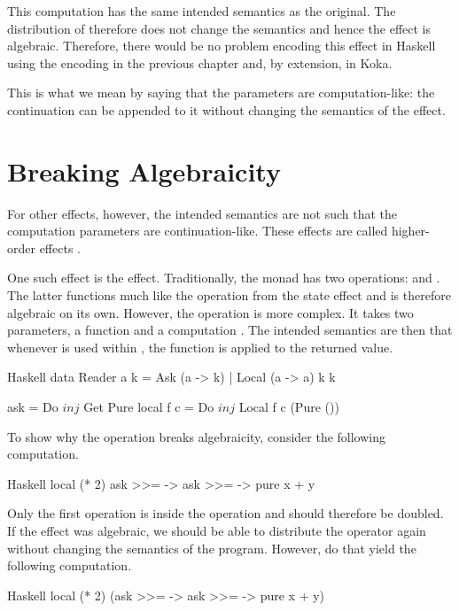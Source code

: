 This computation has the same intended semantics as the original. The distribution of \hs{>>=} therefore does not change the semantics and hence the effect is algebraic. Therefore, there would be no problem encoding this effect in Haskell using the encoding in the previous chapter and, by extension, in Koka.

This is what we mean by saying that the parameters are computation-like: the continuation can be appended to it without changing the semantics of the effect.

\section{Breaking Algebraicity}

For other effects, however, the intended semantics are not such that the computation parameters are continuation-like. These effects are called higher-order effects \citationneeded.

One such effect is the  effect. Traditionally, the  monad has two operations:  and . The latter functions much like the  operation from the state effect and is therefore algebraic on its own. However, the  operation is more complex. It takes two parameters, a function  and a computation . The intended semantics are then that whenever  is used within , the function  is applied to the returned value.

\begin{lst}{Haskell}
data Reader a k = Ask (a -> k) | Local (a -> a) k k

ask       = Do $ inj $ Get Pure
local f c = Do $ inj $ Local f c (Pure ())
\end{lst}

To show why the  operation breaks algebraicity, consider the following computation.

\begin{lst}{Haskell}
local (* 2) ask >>= \x -> ask >>= \y -> pure x + y
\end{lst}

Only the first  operation is inside the  operation and should therefore be doubled. If the  effect was algebraic, we should be able to distribute the \hs{>>=} operator again without changing the semantics of the program. However, do that yield the following computation.

\begin{lst}{Haskell}
local (* 2) (ask >>= \x -> ask >>= \y -> pure x + y)
\end{lst}

